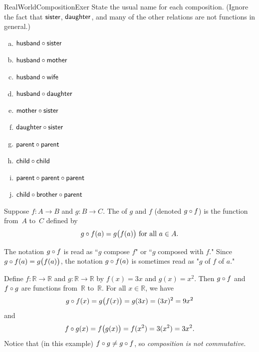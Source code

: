 \begin{exercise}{RealWorldCompositionExer}
State the usual name for each composition. 
 (Ignore the fact that $\sf{sister}$, $\sf{daughter}$, and many of the other relations are not functions in general.)
\begin{enumerate}[(a)]
\item \label{RealWorldCompositionExer-HusbandOfSister}
$\sf{husband} \circ \sf{sister}$
\item \label{RealWorldCompositionExer-HusbandOfMother}
$\sf{husband} \circ \sf{mother}$
\item \label{RealWorldCompositionExer-HusbandOfWife}
$\sf{husband} \circ \sf{wife}$
\item \label{RealWorldCompositionExer-HusbandOfDaughter}
$\sf{husband} \circ \sf{daughter}$
\item \label{RealWorldCompositionExer-MotherOfSister}
$\sf{mother} \circ \sf{sister}$
\item \label{RealWorldCompositionExer-DaughterOfSister}
$\sf{daughter} \circ \sf{sister}$
\item \label{RealWorldCompositionExer-ParentOfParent}
$\sf{parent} \circ \sf{parent}$
\item \label{RealWorldCompositionExer-ChildOfChild}
$\sf{child} \circ \sf{child}$
\item \label{RealWorldCompositionExer-ParentOfParentOfParent}
$\sf{parent} \circ \sf{parent} \circ \sf{parent}$
\item \label{RealWorldCompositionExer-ChildOfBrotherOfParent}
$\sf{child} \circ \sf{brother} \circ \sf{parent}$
\end{enumerate}
\end{exercise}

\begin{defn}\label{defn:composition}
Suppose $f \colon A \to B$ and $g \colon B \to C$. The  of $g$ and $f$ (denoted $g \circ f$) is the function from~$A$ to~$C$ defined by
$$ \mbox{$g \circ f(a) = g \bigl( f(a) \bigr)$ for all $a \in A$.} $$
\end{defn}
 
The notation $g \circ f$ is read as ``$g$ compose $f$" or ``$g$ composed with $f$." Since $g \circ f(a) = g \bigl( f(a) \bigr)$, the notation $g \circ f(a)$ is sometimes read as "$g$ of $f$ of $a$."

\begin{example}{}
Define $f \colon \mathbb{R} \to \mathbb{R}$ and $g \colon \mathbb{R} \to \mathbb{R}$ by
$f(x) = 3x$ and $g(x) = x^2$. Then $g \circ f$ and $f \circ g$ are functions from~$\mathbb{R}$ to~$\mathbb{R}$. For all $x \in \mathbb{R}$, we have
\[ g \circ f(x) = g \bigl( f(x) \bigr) = g(3x) =(3x)^2 =  9x^2 \]
and
\[f \circ g(x) = f \bigl( g(x) \bigr) = f(x^2) = 3(x^2) = 3x^2 .\]
Notice that (in this example) $f \circ g \neq g \circ f$, so \emph{composition is not commutative}.
\end{example}

